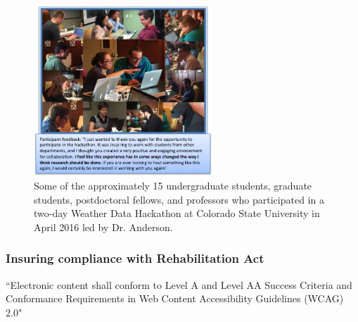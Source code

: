 \documentclass[pdftex,english,11pt,parskip=half]{scrartcl}
\begin{document}
\begin{figure}
\centering
\includegraphics[width = 0.6\textwidth]{figures/csu_hackathon.png}
\caption{Some of the approximately 15 undergraduate students, graduate students, postdoctoral fellows, and professors who participated in a two-day Weather Data Hackathon at Colorado State University in April 2016 led by Dr. Anderson.}
\label{csu-r-hackathon} 
\end{figure}

\subsubsection{Insuring compliance with Rehabilitation Act}

``Electronic content shall conform to Level A and Level AA Success Criteria and Conformance Requirements in Web Content Accessibility Guidelines (WCAG) 2.0"
\end{document}
